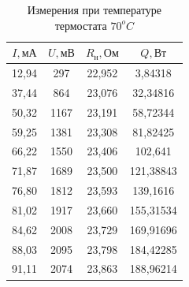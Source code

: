     \begin{table}[!ht]
        \begin{minipage}{.42\linewidth}
            \centering
            \begin{tabular}{|c|c|c|c|}
                \hline

                $I, \text{мА}$ & $U, \text{мВ}$ &  $R_\text{н}, \text{Ом}$ & $Q, \text{Вт}$\\ \hline
                12,94	& 297	& 22,952	& 3,84318 \\ \hline
                37,44	& 864	& 23,076	& 32,34816 \\ \hline
                50,32	& 1167	& 23,191	& 58,72344 \\ \hline
                59,25	& 1381	& 23,308	& 81,82425 \\ \hline
                66,22	& 1550	& 23,406	& 102,641 \\ \hline
                71,87	& 1689	& 23,500	& 121,38843 \\ \hline
                76,80	& 1812	& 23,593	& 139,1616 \\ \hline
                81,02	& 1917	& 23,660	& 155,31534 \\ \hline
                84,62	& 2008	& 23,729	& 169,91696 \\ \hline
                88,03	& 2095	& 23,798    & 184,42285 \\ \hline
                91,11	& 2074	& 23,863	& 188,96214 \\ \hline

            \end{tabular}
            \caption{Измерения при температуре термостата $70^oC$}
            \label{table_61}
        \end{minipage}
    \end{table}
